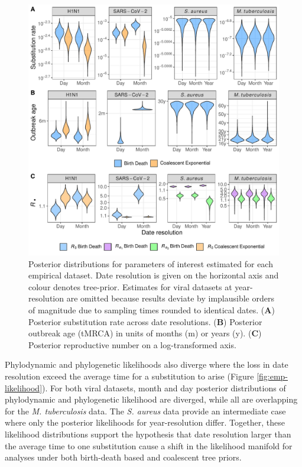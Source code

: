 \documentclass[11pt]{article}
\begin{document}
\begin{spacing}{1.5}
\begin{figure}[H]
    \centering
    \includegraphics[width=\textwidth]{empirical_parms.pdf}
    \caption{Posterior distributions for parameters of interest estimated for each empirical dataset. Date resolution is given on the horizontal axis and colour denotes tree-prior. Estimates for viral datasets at year-resolution are omitted because results deviate by implausible orders of magnitude due to sampling times rounded to identical dates. (\textbf{A}) Posterior substitution rate across date resolutions. (\textbf{B}) Posterior outbreak age (tMRCA) in units of months (m) or years (y).  (\textbf{C}) Posterior reproductive number on a log-transformed axis.}
    \label{fig:emp-parm}
\end{figure}

Phylodynamic and phylogenetic likelihoods also diverge where the loss in date resolution exceed the average time for a substitution to arise (Figure \ref{fig:emp-likelihood}). For both viral datasets, month and day posterior distributions of phylodynamic and phylogenetic likelihood are diverged, while all are overlapping for the \textit{M. tuberculosis} data. The \textit{S. aureus} data provide an intermediate case where only the posterior likelihoods for year-resolution differ. Together, these likelihood distributions support the hypothesis that date resolution larger than the average time to one substitution cause a shift in the likelihood manifold for analyses under both birth-death based and coalescent tree priors.


\end{spacing}
\end{document}
